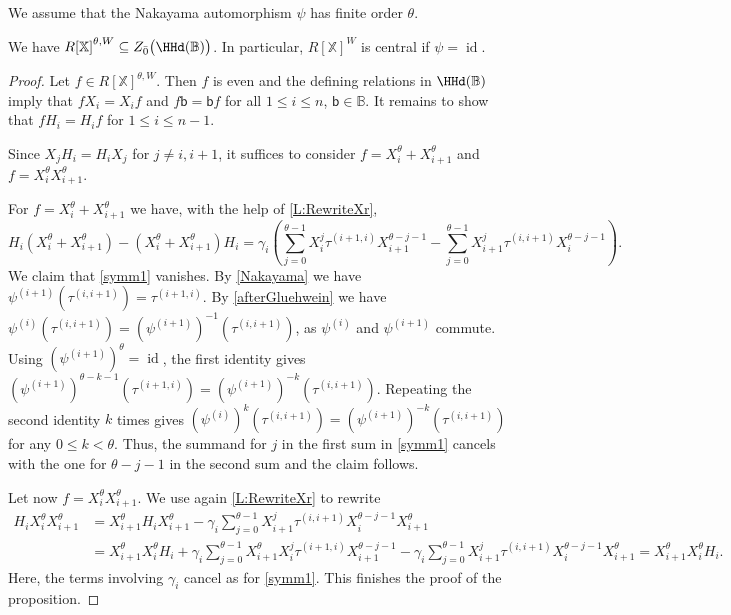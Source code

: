 \documentclass[a4paper,11pt]{amsart}
\numberwithin{equation}{subsection}
\theoremstyle{definition}
\theoremstyle{theorem}
\theoremstyle{remark}
\newcommand\Sym{W}
\newcommand\bb{\mathsf{b}}
\newcommand\op{\operatorname}
\newcommand\X{\mathbb{X}}
\newcommand\RR{R}
\newcommand\RX{{\RR[\X]}}
\newcommand{\Bo}{\mathbb{B}}
\begin{document}
We assume that the Nakayama automorphism $\psi$ has finite order $\theta$.
  \begin{Proposition}\label{P:HHdCenter}
We have $\RX^{\theta,\Sym}\subseteq Z_{\bar{0}}\bigl(\HHd(\Bo)\bigr)$. In particular, $\RX^{\Sym}$ is central if $\psi=\op{id}$.
  \end{Proposition}

\begin{proof}  Let  $f\in\RX^{\theta,\Sym}$. Then $f$ is even and the defining relations in $\HHd(\Bo)$ imply that $fX_i=X_if$ and $f\bb=\bb f$ for all $1\leq i\leq n$, $\bb\in\Bo$.
It remains to show that  $fH_i=H_if$ for $1\leq i\leq n-1$.

Since $X_jH_i=H_iX_j$ for $j\not=i,i+1$, it suffices to consider $f=X_i^\theta + X_{i+1}^\theta$ and  $f=X_i^\theta X_{i+1}^\theta$.

 For $f=X_i^\theta + X_{i+1}^\theta$ we have, with the help of  \autoref{L:RewriteXr},
 \begin{equation}\label{symm1}
H_i(X_i^\theta + X_{i+1}^\theta)-(X_i^\theta + X_{i+1}^\theta)H_i=\gamma_i\left(\sum_{j=0}^{\theta-1}X_i^j\tau^{(i+1,i)}X_{i+1}^{\theta-j-1} -\sum_{j=0}^{\theta-1}X_{i+1}^j\tau^{(i,i+1)}X_{i}^{\theta-j-1}\right).
\end{equation}
We claim that \autoref{symm1} vanishes. By \autoref{Nakayama} we have $\psi^{(i+1)}(\tau^{(i,i+1)})=\tau^{(i+1,i)}$. By \autoref{afterGluehwein} we have $\psi^{(i)}(\tau^{(i,i+1)})=(\psi^{(i+1)})^{-1}(\tau^{(i,i+1)})$, as $\psi^{(i)}$ and $\psi^{(i+1)}$ commute. Using $(\psi^{(i+1)})^\theta=\op{id}$, the first identity gives $(\psi^{(i+1)})^{\theta-k-1}(\tau^{(i+1,i)})=(\psi^{(i+1)})^{-k}(\tau^{(i,i+1)})$. Repeating the second identity $k$ times gives $(\psi^{(i)})^{k}(\tau^{(i,i+1)})=(\psi^{(i+1)})^{-k}(\tau^{(i,i+1)})$ for any $0\leq k<\theta$.
Thus, the summand for $j$ in the first sum in \autoref{symm1} cancels with the one for  $\theta-j-1$ in the second sum and the claim follows.

Let now $f=X_i^\theta X_{i+1}^\theta$. We use again  \autoref{L:RewriteXr} to rewrite
\begin{align*}
H_iX_i^\theta X_{i+1}^\theta&=X_{i+1}^\theta H_iX_{i+1}^\theta-\gamma_i\sum_{j=0}^{\theta-1}X_{i+1}^j\tau^{(i,i+1)}X_{i}^{\theta-j-1}X_{i+1}^\theta\\
&=X_{i+1}^\theta X_{i}^\theta H_i +\gamma_i\sum_{j=0}^{\theta-1}X_{i+1}^\theta X_i^j\tau^{(i+1,i)}X_{i+1}^{\theta-j-1}
-\gamma_i\sum_{j=0}^{\theta-1}X_{i+1}^j\tau^{(i,i+1)}X_{i}^{\theta-j-1}X_{i+1}^\theta=X_{i+1}^\theta X_{i}^\theta H_i.
\end{align*}
Here, the terms involving $\gamma_i$ cancel as for  \autoref{symm1}. This finishes the proof of the proposition.
\end{proof}
\end{document}
